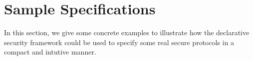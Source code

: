 \section{Sample Specifications}

In this section, we give some concrete examples to illustrate how the declarative security framework could 
be used to specify some real secure protocols in a compact and intutive manner.





